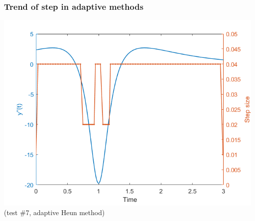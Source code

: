 \documentclass{beamer}
\begin{document}
\begin{frame} %
	\frametitle{Trend of step in adaptive methods}
	\begin{center}
		\includegraphics[width=0.8\linewidth]{etc/step_history_7_adapHeun.png} \\
		(test \#7, adaptive Heun method)
	\end{center}	
\end{frame}
\end{document}
